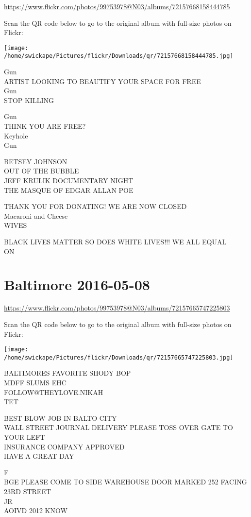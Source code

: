 \documentclass[10pt,letterpaper]{article}
\begin{document}
\url{https://www.flickr.com/photos/99753978@N03/albums/72157668158444785}

Scan the QR code below to go to the original album with full-size photos on Flickr:

\texttt{[image: /home/swickape/Pictures/flickr/Downloads/qr/72157668158444785.jpg]}
\pagebreak

Gun\\
ARTIST LOOKING TO BEAUTIFY YOUR SPACE FOR FREE\\
Gun\\
STOP KILLING

Gun\\
THINK YOU ARE FREE?\\
Keyhole\\
Gun

BETSEY JOHNSON\\
OUT OF THE BUBBLE\\
JEFF KRULIK DOCUMENTARY NIGHT\\
THE MASQUE OF EDGAR ALLAN POE

THANK YOU FOR DONATING!  WE ARE NOW CLOSED\\
Macaroni and Cheese\\
WIVES

BLACK LIVES MATTER SO DOES WHITE LIVES!!! WE ALL EQUAL\\
ON
\pagebreak

\section*{Baltimore 2016-05-08}

\url{https://www.flickr.com/photos/99753978@N03/albums/72157665747225803}

Scan the QR code below to go to the original album with full-size photos on Flickr:

\texttt{[image: /home/swickape/Pictures/flickr/Downloads/qr/72157665747225803.jpg]}
\pagebreak

BALTIMORES FAVORITE SHODY BOP\\
MDFF SLUMS EHC\\
FOLLOW@THEYLOVE.NIKAH\\
TET

BEST BLOW JOB IN BALTO CITY\\
WALL STREET JOURNAL DELIVERY PLEASE TOSS OVER GATE TO YOUR LEFT\\
INSURANCE COMPANY APPROVED\\
HAVE A GREAT DAY

F\\
BGE PLEASE COME TO SIDE WAREHOUSE DOOR MARKED 252 FACING 23RD STREET\\
JR\\
AOIVD 2012 KNOW
\end{document}
